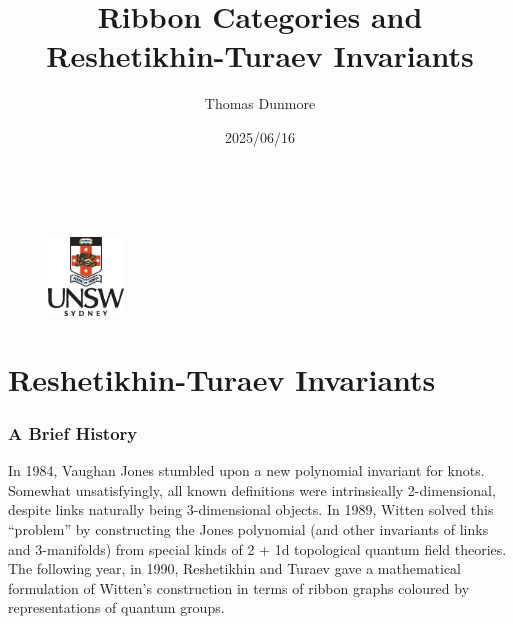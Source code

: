 \documentclass{beamer}
\title[Ribbon Categories and RT Invariants]{Ribbon Categories and Reshetikhin-Turaev Invariants}%
\author[Thomas Dunmore]{Thomas Dunmore}
\institute[UNSW]{
	University of New South Wales \\
	\medskip
	\textit{t.dunmore@unsw.edu.au}
}
\date{2025/06/16}
\begin{document}

\begin{frame}
\titlepage
\noindent\\[-15pt]
\begin{figure}[!ht]
\includegraphics[width=2cm]{unsw-crest}
\end{figure}
\end{frame}



\section{Reshetikhin-Turaev Invariants}


\begin{frame}
\frametitle{A Brief History}
In 1984, Vaughan Jones stumbled upon a new polynomial invariant for knots. Somewhat unsatisfyingly, all known definitions were intrinsically 2-dimensional, despite links naturally being 3-dimensional objects.
\newline\newline
In 1989, Witten solved this ``problem'' by constructing the Jones polynomial (and other invariants of links and 3-manifolds) from special kinds of 2 + 1d topological quantum field theories.
\newline\newline
The following year, in 1990, Reshetikhin and Turaev gave a mathematical formulation of Witten's construction in terms of ribbon graphs coloured by representations of quantum groups.
\end{frame}
\end{document}
